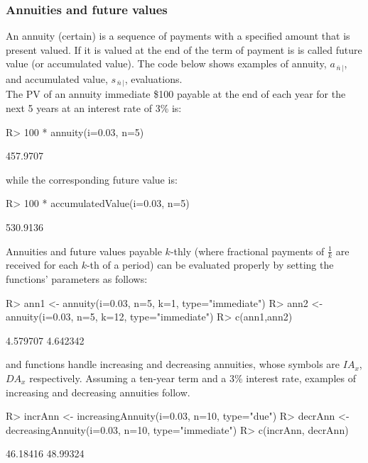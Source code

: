 \documentclass[nojss]{jss}
\begin{document}
\subsubsection{Annuities and future values}\label{sss:annfv}

An annuity (certain) is a sequence of payments with a specified amount that is
present valued. If it is valued at the end of the term of payment
is is called future value (or accumulated value). The code below shows examples of annuity, $a_{\left.
{\overline {\, n \,}}\! \right| }$, and accumulated value, $s_{\left. {\overline {\, n \,}}\! \right| }$,  evaluations.\\
The PV of an annuity immediate \$100 payable at the end of each year for the next 5 years at an interest rate of 3\% is: 
\begin{Schunk}
\begin{Sinput}
R> 100 * annuity(i=0.03, n=5)
\end{Sinput}
\begin{Soutput}
[1] 457.9707
\end{Soutput}
\end{Schunk}
while the corresponding future value is:
\begin{Schunk}
\begin{Sinput}
R> 100 * accumulatedValue(i=0.03, n=5)
\end{Sinput}
\begin{Soutput}
[1] 530.9136
\end{Soutput}
\end{Schunk}

Annuities and future values payable $k$-thly (where fractional payments of $\frac{1}{k}$
are received for each $k$-th of a period) can be evaluated properly by setting the
functions' parameters as follows:

\begin{Schunk}
\begin{Sinput}
R> ann1 <- annuity(i=0.03, n=5, k=1, type="immediate")
R> ann2 <- annuity(i=0.03, n=5, k=12, type="immediate")
R> c(ann1,ann2)
\end{Sinput}
\begin{Soutput}
[1] 4.579707 4.642342
\end{Soutput}
\end{Schunk}




 and  functions handle
increasing and decreasing annuities, whose symbols are $IA_{x}$, $DA_{x}$
respectively. Assuming a ten-year term and a 3\% interest rate,
examples of increasing and decreasing annuities follow.
\begin{Schunk}
\begin{Sinput}
R> incrAnn <- increasingAnnuity(i=0.03, n=10, type="due")
R> decrAnn <- decreasingAnnuity(i=0.03, n=10, type="immediate")
R> c(incrAnn, decrAnn)
\end{Sinput}
\begin{Soutput}
[1] 46.18416 48.99324
\end{Soutput}
\end{Schunk}
\end{document}
